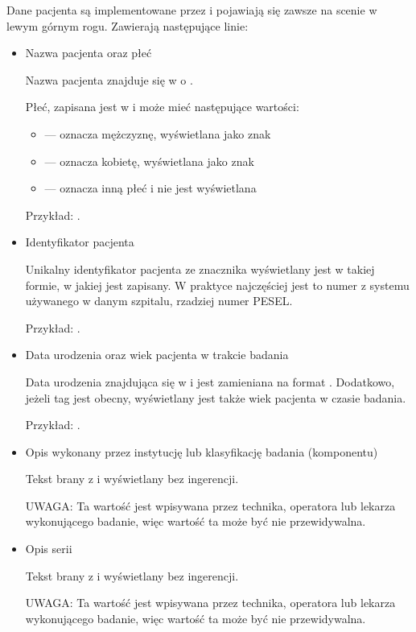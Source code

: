 Dane pacjenta są implementowane przez  i pojawiają się zawsze na scenie w lewym górnym rogu.
Zawierają następujące linie:
\begin{itemize}
    \item Nazwa pacjenta oraz płeć

          Nazwa pacjenta znajduje się w  o .

          Płeć, zapisana jest w  i może mieć następujące wartości:
          \begin{itemize}
              \item {} --- oznacza mężczyznę, wyświetlana jako znak \utfMaleSign
              \item {} --- oznacza kobietę, wyświetlana jako znak \utfFemaleSign
              \item {} --- oznacza inną płeć i nie jest wyświetlana
          \end{itemize}

          Przykład: .

    \item Identyfikator pacjenta

          Unikalny identyfikator pacjenta ze znacznika  wyświetlany jest w takiej formie, w jakiej jest zapisany.
          W praktyce najczęściej jest to numer z systemu używanego w danym szpitalu, rzadziej numer PESEL.

          Przykład: .

    \item Data urodzenia oraz wiek pacjenta w trakcie badania

          Data urodzenia znajdująca się w  i jest zamieniana na format .
          Dodatkowo, jeżeli tag  jest obecny, wyświetlany jest także wiek pacjenta w czasie badania.

          Przykład: .

    \item Opis wykonany przez instytucję lub klasyfikację badania (komponentu)

          Tekst brany z  i wyświetlany bez ingerencji.

          UWAGA: Ta wartość jest wpisywana przez technika, operatora lub lekarza wykonującego badanie, więc wartość ta może być nie przewidywalna.

    \item Opis serii

          Tekst brany z  i wyświetlany bez ingerencji.

          UWAGA: Ta wartość jest wpisywana przez technika, operatora lub lekarza wykonującego badanie, więc wartość ta może być nie przewidywalna.
\end{itemize}

